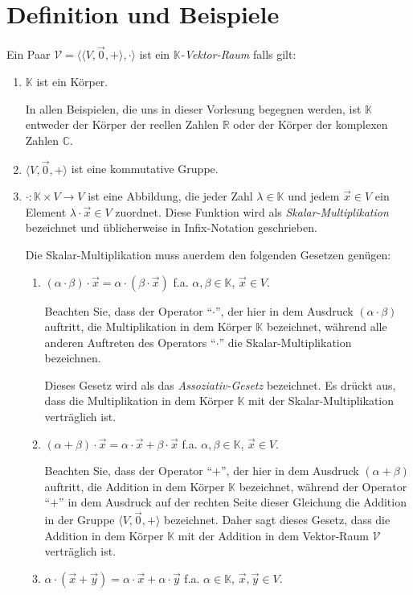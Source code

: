 \section{Definition und Beispiele}
\begin{Definition}
Ein Paar $\mathcal{V} = \bigl\langle \langle V, \vec{0}, + \rangle, \cdot \bigr\rangle$ ist ein \emph{$\mathbb{K}$-Vektor-Raum} falls gilt:
\begin{enumerate}
\item $\mathbb{K}$ ist ein K\"{o}rper.  

      In allen Beispielen, die uns in dieser Vorlesung begegnen werden,
      ist $\mathbb{K}$ entweder der K\"{o}rper der reellen Zahlen $\mathbb{R}$ oder der K\"{o}rper der komplexen Zahlen $\mathbb{C}$. 
\item $\langle V, \vec{0}, + \rangle$ ist eine kommutative Gruppe.
\item $\cdot: \mathbb{K} \times V \rightarrow V$ ist eine Abbildung, die jeder Zahl $\lambda \in \mathbb{K}$ und jedem 
      $\vec{x} \in V$ ein Element $\lambda \cdot \vec{x} \in V$ zuordnet. 
      Diese Funktion  wird als \emph{Skalar-Multiplikation} bezeichnet und \"{u}blicherweise in Infix-Notation geschrieben.

      Die Skalar-Multiplikation muss au\3erdem den folgenden Gesetzen gen\"{u}gen:
      \begin{enumerate}
      \item $(\alpha \cdot \beta)  \cdot \vec{x} =  \alpha \cdot (\beta \cdot \vec{x})$ \quad f.a.  $\alpha,\beta \in \mathbb{K}$,  $\vec{x} \in V$.

            Beachten Sie, dass der Operator ``$\cdot$'', der hier in dem Ausdruck $(\alpha \cdot \beta)$ auftritt, die Multiplikation in dem K\"{o}rper $\mathbb{K}$ bezeichnet, 
            w\"{a}hrend alle anderen Auftreten des Operators ``$\cdot$'' die Skalar-Multiplikation bezeichnen.

            Dieses Gesetz wird als das \emph{Assoziativ-Gesetz} bezeichnet.  Es dr\"{u}ckt
            aus, dass die Multiplikation in dem K\"{o}rper $\mathbb{K}$ mit der Skalar-Multiplikation
            vertr\"{a}glich ist.
      \item $(\alpha + \beta) \cdot \vec{x} = \alpha \cdot \vec{x} + \beta \cdot \vec{x}$ \quad f.a.  $\alpha,\beta \in \mathbb{K}$,  $\vec{x} \in V$.

            Beachten Sie, dass der Operator ``$+$'', der  hier in dem Ausdruck $(\alpha + \beta)$ auftritt, die Addition in dem K\"{o}rper $\mathbb{K}$ bezeichnet, 
            w\"{a}hrend der Operator ``$+$'' in dem Ausdruck auf der rechten Seite dieser Gleichung die
            Addition in der Gruppe $\langle V, \vec{0}, + \rangle$ bezeichnet.  Daher sagt dieses Gesetz,
            dass die Addition in dem K\"{o}rper $\mathbb{K}$ mit der Addition in dem Vektor-Raum
            $\mathcal{V}$ vertr\"{a}glich ist.
      \item $\alpha \cdot (\vec{x} + \vec{y}) = \alpha \cdot \vec{x} + \alpha \cdot \vec{y}$ \quad f.a. $\alpha \in \mathbb{K}$,  $\vec{x}, \vec{y} \in V$.


\end{enumerate}
\end{enumerate}
\end{Definition}
